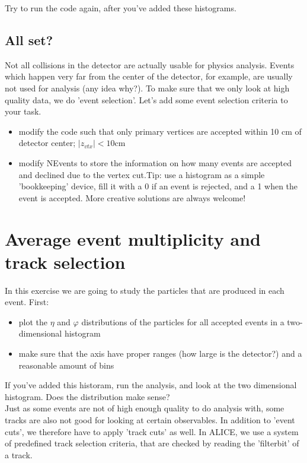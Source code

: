 \documentclass{article}
\begin{document}
Try to run the code again, after you've added these histograms. 

\subsection{All set?}

Not all collisions in the detector are actually usable for physics analysis. Events which happen very far from the center of the detector, for example, are usually not used for analysis (any idea why?). To make sure that we only look at high quality data, we do 'event selection'. Let's add some event selection criteria to your task. 
\begin{itemize}
\item modify the code such that only primary vertices are accepted within 10 cm of detector center; $|z_{vtx}|<10$cm
\item modify NEvents to store the information on how many events are accepted and declined due to the vertex cut.Tip: use a histogram as a simple 'bookkeeping' device, fill it with a 0 if an event is rejected, and a 1 when the event is accepted. More creative solutions are always welcome!
\end{itemize}


\section{Average event multiplicity and track selection}

In this exercise we are going to study the particles that are produced in each event. First:
\begin{itemize}
\item plot the $\eta$ and $\varphi$ distributions of the particles for all accepted events in a two-dimensional histogram
\item make sure that the axis have proper ranges (how large is the detector?) and a reasonable amount of bins
\end{itemize}

If you've added this historam, run the analysis, and look at the two dimensional histogram. Does the distribution make sense?\\

Just as some events are not of high enough quality to do analysis with, some tracks are also not good for looking at certain observables. In addition to 'event cuts', we therefore have to apply 'track cuts' as well. In ALICE, we use a system of predefined track selection criteria, that are checked by reading the 'filterbit' of a track. 
\end{document}
